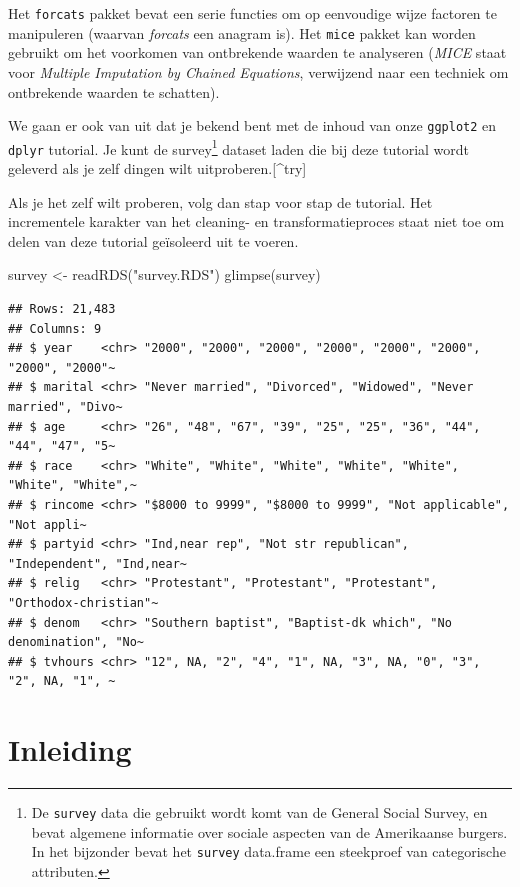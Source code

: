 \documentclass[]{tufte-book}
\newenvironment{Shaded}{}{}
\newcommand{\FunctionTok}[1]{\textcolor[rgb]{0.02,0.16,0.49}{#1}}
\newcommand{\NormalTok}[1]{#1}
\newcommand{\OtherTok}[1]{\textcolor[rgb]{0.00,0.44,0.13}{#1}}
\newcommand{\StringTok}[1]{\textcolor[rgb]{0.25,0.44,0.63}{#1}}
\begin{document}
Het \texttt{forcats} pakket bevat een serie functies om op eenvoudige wijze factoren te manipuleren (waarvan \emph{forcats} een anagram is). Het \texttt{mice} pakket kan worden gebruikt om het voorkomen van ontbrekende waarden te analyseren (\emph{MICE} staat voor \emph{Multiple Imputation by Chained Equations}, verwijzend naar een techniek om ontbrekende waarden te schatten).

We gaan er ook van uit dat je bekend bent met de inhoud van onze \texttt{ggplot2} en \texttt{dplyr} tutorial. Je kunt de survey\footnote{De \texttt{survey} data die gebruikt wordt komt van de General Social Survey, en bevat algemene informatie over sociale aspecten van de Amerikaanse burgers. In het bijzonder bevat het \texttt{survey} data.frame een steekproef van categorische attributen.} dataset laden die bij deze tutorial wordt geleverd als je zelf dingen wilt uitproberen.{[}\^{}try{]}

Als je het zelf wilt proberen, volg dan stap voor stap de tutorial. Het incrementele karakter van het cleaning- en transformatieproces staat niet toe om delen van deze tutorial geïsoleerd uit te voeren.

\begin{Shaded}
\begin{Highlighting}[]
\NormalTok{survey }\OtherTok{\textless{}{-}} \FunctionTok{readRDS}\NormalTok{(}\StringTok{"survey.RDS"}\NormalTok{)}
\FunctionTok{glimpse}\NormalTok{(survey)}
\end{Highlighting}
\end{Shaded}

\begin{verbatim}
## Rows: 21,483
## Columns: 9
## $ year    <chr> "2000", "2000", "2000", "2000", "2000", "2000", "2000", "2000"~
## $ marital <chr> "Never married", "Divorced", "Widowed", "Never married", "Divo~
## $ age     <chr> "26", "48", "67", "39", "25", "25", "36", "44", "44", "47", "5~
## $ race    <chr> "White", "White", "White", "White", "White", "White", "White",~
## $ rincome <chr> "$8000 to 9999", "$8000 to 9999", "Not applicable", "Not appli~
## $ partyid <chr> "Ind,near rep", "Not str republican", "Independent", "Ind,near~
## $ relig   <chr> "Protestant", "Protestant", "Protestant", "Orthodox-christian"~
## $ denom   <chr> "Southern baptist", "Baptist-dk which", "No denomination", "No~
## $ tvhours <chr> "12", NA, "2", "4", "1", NA, "3", NA, "0", "3", "2", NA, "1", ~
\end{verbatim}

\hypertarget{inleiding}{%
\section{Inleiding}\label{inleiding}}
\end{document}
